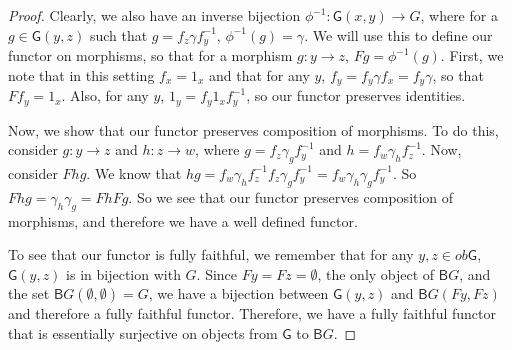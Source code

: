 \documentclass[main.tex]{subfiles}
\begin{document}
\begin{proof}
	Clearly, we also have an inverse bijection $\phi^{-1}: \textsf{G}(x,y)
	\rightarrow G$, where for a $g \in \textsf{G}(y,z)$ such that $g = f_z\gamma
	f_y^{-1}$, $\phi^{-1}(g) = \gamma$. We will use this to define our functor
	on morphisms, so that for a morphism $g: y\rightarrow z$, $Fg =
	\phi^{-1}(g)$. First, we note that in this setting $f_x = 1_x$ and that for
	any $y$, $f_y = f_y\gamma f_x = f_y\gamma$, so that $Ff_y = 1_x$. Also, for
	any $y$, $1_y = f_y 1_x f_y^{-1}$, so our functor preserves identities.

	Now, we show that our functor preserves composition of morphisms. To do
	this, consider $g: y\rightarrow z$ and $h: z \rightarrow w$, where $g =
	f_z\gamma_gf_y^{-1}$ and $h = f_w\gamma_hf_z^{-1}$. Now, consider $Fhg$. We
	know that $hg = f_w\gamma_hf_z^{-1}f_z\gamma_gf_y^{-1} =
	f_w\gamma_h\gamma_gf_y^{-1}$. So $Fhg = \gamma_h\gamma_g = FhFg$. So we see
	that our functor preserves composition of morphisms, and therefore we have a
	well defined functor.

	To see that our functor is fully faithful, we remember that for any $y,z \in
	ob\textsf{G}$, $\textsf{G}(y,z)$ is in bijection with $G$. Since $Fy = Fz =
	\emptyset$, the only object of $\textsf{B}G$, and the set
	$\textsf{B}G(\emptyset, \emptyset) = G$, we have a bijection between
	$\textsf{G}(y,z)$ and $\textsf{B}G(Fy, Fz)$ and therefore a fully faithful
	functor. Therefore, we have a fully faithful functor that is essentially
	surjective on objects from $\textsf{G}$ to $\textsf{B}G$.


\end{proof}
\end{document}
